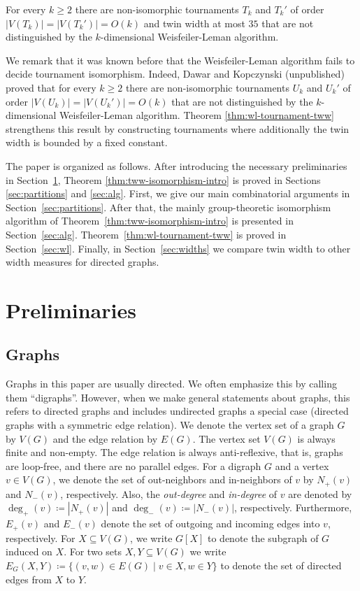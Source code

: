\documentclass{theoretics}
\begin{document}
\begin{theorem}
 \label{thm:wl-tournament-tww}
 For every $k \geq 2$ there are non-isomorphic tournaments $T_k$ and $T_k'$ of order $|V(T_k)| = |V(T_k')| = O(k)$ and twin width at most $35$ that are not distinguished by the $k$-dimensional Weisfeiler-Leman algorithm.
\end{theorem}

We remark that it was known before that the Weisfeiler-Leman algorithm fails to decide tournament isomorphism.
Indeed, Dawar and Kopczynski (unpublished) proved that for every $k \geq 2$ there are non-isomorphic tournaments $U_k$ and $U_k'$ of order $|V(U_k)| = |V(U_k')| = O(k)$ that are not distinguished by the $k$-dimensional Weisfeiler-Leman algorithm.
Theorem \ref{thm:wl-tournament-tww} strengthens this result by constructing tournaments where additionally the twin width is bounded by a fixed constant.

The paper is organized as follows.
After introducing the necessary preliminaries in Section~\ref{sec:preliminaries}, Theorem \ref{thm:tww-isomorphism-intro} is proved in Sections \ref{sec:partitions} and \ref{sec:alg}.
First, we give our main combinatorial arguments in Section~\ref{sec:partitions}.
After that, the mainly group-theoretic isomorphism algorithm of Theorem~\ref{thm:tww-isomorphism-intro} is presented in Section~\ref{sec:alg}.
Theorem~\ref{thm:wl-tournament-tww} is proved in Section~\ref{sec:wl}.
Finally, in Section~\ref{sec:widths} we compare twin width to other width measures for directed graphs.


\section{Preliminaries}
\label{sec:preliminaries}

\subsection{Graphs}

Graphs in this paper are usually directed.
We often emphasize this by calling them ``digraphs''.
However, when we make general statements about graphs, this refers to directed graphs and includes undirected graphs a special case (directed graphs with a symmetric edge relation).
We denote the vertex set of a graph $G$ by $V(G)$ and the edge relation by $E(G)$.
The vertex set $V(G)$ is always finite and non-empty.
The edge relation is always anti-reflexive, that is, graphs are loop-free, and there are no parallel edges.
For a digraph $G$ and a vertex $v \in V(G)$, we denote the set of out-neighbors and in-neighbors of $v$ by $N_+(v)$ and $N_-(v)$, respectively.
Also, the \emph{out-degree} and \emph{in-degree} of $v$ are denoted by $\deg_+(v) \coloneqq |N_+(v)|$ and $\deg_-(v) \coloneqq |N_-(v)|$, respectively.
Furthermore, $E_+(v)$ and $E_-(v)$ denote the set of outgoing and incoming edges into $v$, respectively.
For $X\subseteq V(G)$, we write $G[X]$ to denote the subgraph of $G$ induced on $X$.
For two sets $X,Y \subseteq V(G)$ we write $E_G(X,Y) \coloneqq \{(v,w) \in E(G) \mid v \in X, w \in Y\}$ to denote the set of directed edges from $X$ to $Y$.
\end{document}
